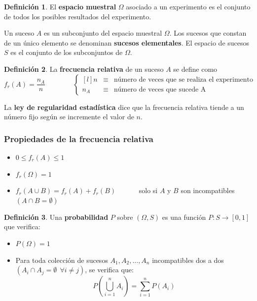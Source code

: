 \documentclass[a4paper]{book}
\numberwithin{figure}{section}
\numberwithin{equation}{subsection}
\numberwithin{figure}{chapter}
\theoremstyle{definition}
\newtheorem{definicion}{Definición}
\begin{document}
\begin{definicion}
	El \textbf{espacio muestral} $ \Omega $ asociado a un experimento es el conjunto de todos los posibles resultados del experimento.

	Un suceso $A$ es un subconjunto del espacio muestral $\Omega$. Los sucesos que constan de un único elemento se denominan \textbf{sucesos elementales}. El espacio de sucesos $S$ es el conjunto de los subconjuntos de $\Omega$.
\end{definicion}

\begin{definicion}
	La \textbf{frecuencia relativa} de un suceso $A$ se define como \[f_r(A) = \frac{n_A}{n} \qquad \qquad \left\lbrace \begin{matrix*}[l] n & \equiv & \text{número de veces que se realiza el experimento}\\
			n_A & \equiv & \text{número de veces que sucede A}
		\end{matrix*} \right. \]

	La \textbf{ley de regularidad estadística} dice que la frecuencia relativa tiende a un número fijo según se incremente el valor de $n$.
\end{definicion}

\subsubsection*{Propiedades de la frecuencia relativa}
\begin{itemize}
	\item $0\leq f_r(A)\leq 1$
	\item $f_r(\Omega )=1$
	\item $ f_r\left( A \cup B \right) = f_r(A) + f_r(B)\qquad \quad $ solo si $A$ y $B$ son incompatibles $\left( A \cap B = \emptyset \right)$
\end{itemize}
\newpage

\begin{definicion}
	Una \textbf{probabilidad} $P$ sobre $(\Omega, S)$ es una función $P: S \longrightarrow [0,1]$ que verifica:
\end{definicion}

\begin{itemize}
	\item $P(\Omega )=1$
	\item Para toda colección de sucesos $A_1,A_2,\ldots , A_n$ incompatibles dos a dos\\ $\left( A_i \cap A_j = \emptyset \ \ \forall i \not = j \right)$, se verifica que: \[P\left( \bigcup _{i=1}^n A_i \right) = \sum^{n}_{i=1}{P\left( A_i \right)} \]
\end{itemize}
\end{document}
